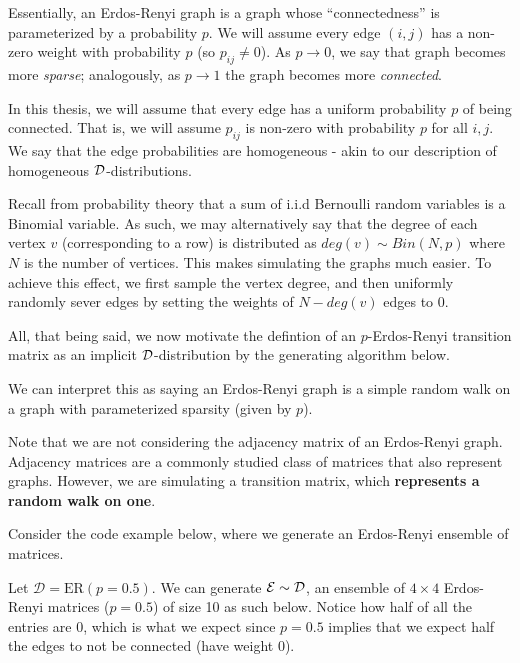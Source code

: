 Essentially, an Erdos-Renyi graph is a graph whose ``connectedness'' is parameterized by a probability $p$.
We will assume every edge $(i,j)$ has a non-zero weight with probability $p$ (so $p_{ij} \neq 0$).
As $p \to 0$, we say that graph becomes more \textit{sparse}; analogously, as $p \to 1$ the graph becomes more \textit{connected}.

\begin{remark}[Homogeneity]
In this thesis, we will assume that every edge has a uniform probability $p$ of being connected.
That is, we will assume $p_{ij}$ is non-zero with probability $p$ for all $i,j$.
We say that the edge probabilities are homogeneous - akin to our description of homogeneous $\mathcal{D}$-distributions.
\end{remark}

Recall from probability theory that a sum of i.i.d Bernoulli random variables is a Binomial variable.
As such, we may alternatively say that the degree of each vertex $v$ (corresponding to a row) is distributed as $deg(v) \sim Bin(N,p)$ where $N$ is the number of vertices.
This makes simulating the graphs much easier. To achieve this effect, we first sample the vertex degree, and then uniformly randomly sever edges by setting the weights of $N - deg(v)$ edges to $0$. \newline

All, that being said, we now motivate the defintion of an $p$-Erdos-Renyi transition matrix as an implicit $\mathcal{D}$-distribution by the generating algorithm below.

\ALGerdos

We can interpret this as saying an Erdos-Renyi graph is a simple random walk on a graph with parameterized sparsity (given by $p$).

\begin{warning}
Note that we are not considering the adjacency matrix of an Erdos-Renyi graph. Adjacency matrices are a commonly studied class of matrices that also represent graphs.
However, we are simulating a transition matrix, which \textbf{represents a random walk on one}.
\end{warning}

Consider the code example below, where we generate an Erdos-Renyi ensemble of matrices.

\begin{code}[Erdos-Renyi p = 0.5 Ensemble]
Let $\mathcal{D} = \text{ER}(p = 0.5)$. We can generate $\mathcal{E} \sim \mathcal{D}$, an ensemble of $4 \times 4$ Erdos-Renyi matrices ($p = 0.5$) of size 10 as such below.
Notice how half of all the entries are $0$, which is what we expect since $p = 0.5$ implies that we expect half the edges to not be connected (have weight 0).
\end{code}

